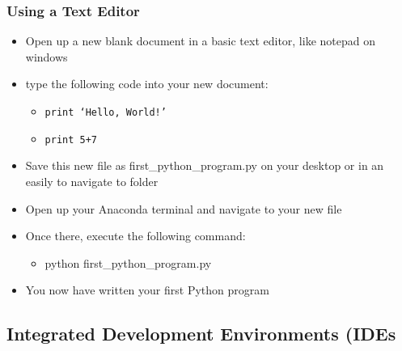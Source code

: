\documentclass[mini frame in current subsection]{beamer}
\begin{document}
	
		\begin{frame}
			\frametitle{Using a Text Editor}
			\begin{itemize}
				\vfill \item  Open up a new blank document in a basic text editor, like notepad on windows
				\vfill \item  type the following code into your new document:
					\begin{itemize}
						\item  \texttt{print `Hello, World!'}
						\item  \texttt{print 5+7}
					\end{itemize}
				\vfill \item  Save this new file as first\_python\_program.py on your desktop or in an easily to navigate to folder
				\vfill \item  Open up your Anaconda terminal and navigate to your new file

				\vfill \item  Once there, execute the following command:
					\begin{itemize}
						\item  python first\_python\_program.py
					\end{itemize}
				\vfill \item  You now have written your first Python program
			\end{itemize}		
				
		\end{frame}
		
	\subsection{Integrated Development Environments (IDEs}
	
\end{document}
